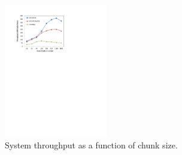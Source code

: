 \begin{figure}[htb]
	\centering
	\includegraphics[width=0.40\textwidth]{figures/chunk-size}
  \caption{\footnotesize{System throughput as a function of chunk size. }}
	\label{fig:chunk-size}
\end{figure}
